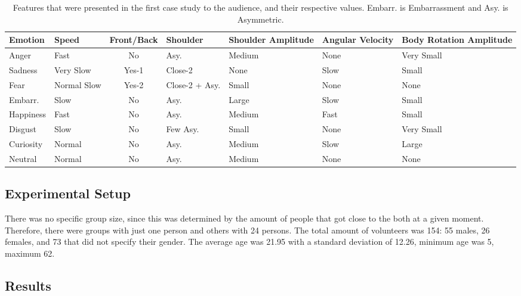 \begin{table}[tbh]
\begin{center}
\small
\caption{Features that were presented in the first case study to the audience, and their respective values. Embarr. is Embarrassment and Asy. is Asymmetric.}
\label{table:features}
\begin{tabular}{|p{1.5 cm}|p{1.5 cm}|c|p{1.5 cm}|p{1.6 cm}|p{1.6 cm}|m{1.5 cm}|}
\hline 
\textbf{Emotion} & \textbf{Speed} & \textbf{Front/Back} & \textbf{Shoulder} & \textbf{Shoulder Amplitude} & \textbf{Angular Velocity} & \textbf{Body Rotation Amplitude} \\ 
\hline
Anger & Fast & No & Asy. & Medium & None & Very Small \\
\hline
Sadness & Very Slow & Yes-1 & Close-2 & None & Slow & Small \\
\hline
Fear & Normal Slow & Yes-2 & Close-2 + Asy. & Small & None & None \\ 
\hline
Embarr. & Slow & No & Asy. & Large & Slow & Small \\
\hline
Happiness & Fast & No & Asy. & Medium & Fast & Small \\
\hline
Disgust & Slow & No & Few Asy. & Small & None & Very Small \\
\hline
Curiosity & Normal & No & Asy. & Medium & Slow & Large \\
\hline
Neutral & Normal & No & Asy. & Medium & None & None \\
\hline
\end{tabular}
\end{center}
\vspace{-0.5cm}
\end{table} 

\subsection{Experimental Setup}

There was no specific group size, since this was determined by the amount of people that got close to the both at a given moment. Therefore, there were groups with just one person and others with 24 persons. The total amount of volunteers was 154: 55 males, 26 females, and 73 that did not specify their gender. The average age was 21.95 with a standard deviation of 12.26, minimum age was 5, maximum 62.

\subsection{Results}

